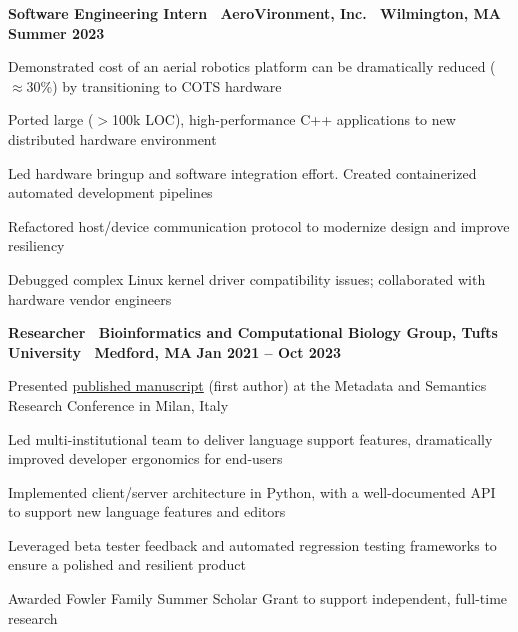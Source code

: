\documentclass[10pt]{article}
\newenvironment{mylist}[1][]
{\itemize[nosep, wide=0pt, leftmargin=*, after=\strut]}
{\enditemize}
\begin{document}
\begin{minipage}[t]{\linewidth}
    \textbf{Software Engineering Intern \textbar \ AeroVironment, Inc. \textbar \ Wilmington, MA} \hfill \textbf{Summer 2023} 
    \begin{mylist}
        \item Demonstrated cost of an aerial robotics platform can be dramatically reduced ($\approx$30\%) by transitioning to COTS hardware
        \item Ported large ($>$100k LOC), high-performance C++ applications to new distributed hardware environment
        \item Led hardware bringup and software integration effort. Created containerized automated development pipelines
        \item Refactored host/device communication protocol to modernize design and improve resiliency
        \item Debugged complex Linux kernel driver compatibility issues; collaborated with hardware vendor engineers
    \end{mylist}
\end{minipage}

\begin{minipage}[t]{\linewidth}
    \textbf{Researcher \textbar \ Bioinformatics and Computational Biology Group, Tufts University \textbar \ Medford, MA} \hfill \textbf{Jan 2021 -- Oct 2023}
    \begin{mylist}
    \item Presented \href{https://link.springer.com/chapter/10.1007/978-3-031-65990-4_25}{published manuscript} (first author) at the Metadata and Semantics Research Conference in Milan, Italy
        \item Led multi-institutional team to deliver language support features, dramatically improved developer ergonomics for end-users
        \item Implemented client/server architecture in Python, with a well-documented API to support new language features and editors
        \item Leveraged beta tester feedback and automated regression testing frameworks to ensure a polished and resilient product
        \item Awarded Fowler Family Summer Scholar Grant to support independent, full-time research
    \end{mylist}
\end{minipage}
\end{document}

